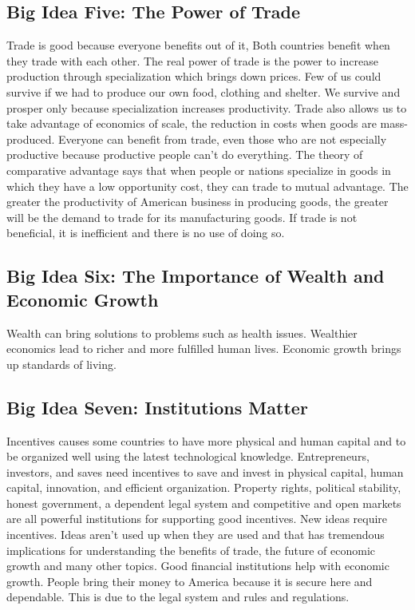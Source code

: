 \documentclass[12pt]{article}
\begin{document}
\subsection{Big Idea Five: The Power of Trade}
Trade is good because everyone benefits out of it, Both countries benefit when they trade with each other. The real power of trade is the power to increase production through specialization which brings down prices. Few of us could survive if we had to produce our own food, clothing and shelter. We survive and prosper only because specialization increases productivity. Trade also allows us to take advantage of economics of scale, the reduction in costs when goods are mass-produced. Everyone can benefit from trade, even those who are not especially productive because productive people can't do everything. The theory of comparative advantage says that when people or nations specialize in goods in which they have a low opportunity cost, they can trade to mutual advantage. The greater the productivity of American business in producing goods, the greater will be the demand to trade for its manufacturing goods. If trade is not beneficial, it is inefficient and there is no use of doing so. 

\subsection{Big Idea Six: The Importance of Wealth and Economic Growth} 
Wealth can bring solutions to problems such as health issues. Wealthier economics lead to richer and more fulfilled human lives. Economic growth brings up standards of living. 

\subsection{Big Idea Seven: Institutions Matter}
Incentives causes some countries to have more physical and human capital and to be organized well using the latest technological knowledge. Entrepreneurs, investors, and saves need incentives to save and invest in physical capital, human capital, innovation, and efficient organization. Property rights, political stability, honest government, a dependent legal system and competitive and open markets are all powerful institutions for supporting good incentives. New ideas require incentives. Ideas aren't used up when they are used and that has tremendous implications for understanding the benefits of trade, the future of economic growth and many other topics. Good financial institutions help with economic growth. People bring their money to America because it is secure here and dependable. This is due to the legal system and rules and regulations. 
\end{document}
